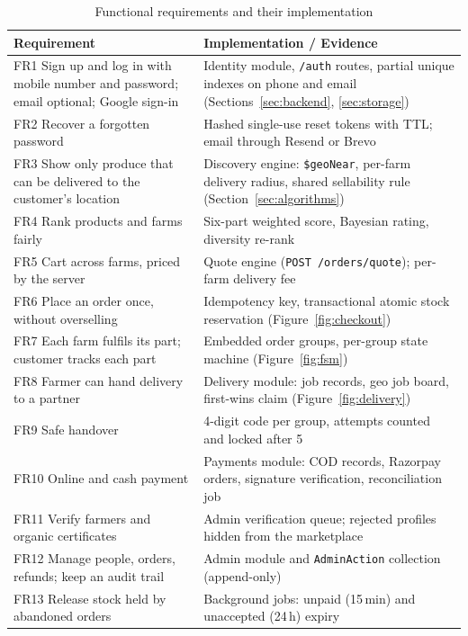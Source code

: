 \documentclass[manuscript,screen,review]{acmart}
\begin{document}
\begin{table}[htbp]
  \caption{Functional requirements and their implementation}
  \label{tab:requirements}
  \small
  \begin{tabularx}{\columnwidth}{@{}p{}L@{}}
    \toprule
    \textbf{Requirement} & \textbf{Implementation / Evidence} \\
    \midrule
    FR1 Sign up and log in with mobile number and password; email optional; Google sign-in & Identity module, \texttt{/auth} routes, partial unique indexes on phone and email (Sections~\ref{sec:backend}, \ref{sec:storage}) \\
    FR2 Recover a forgotten password & Hashed single-use reset tokens with TTL; email through Resend or Brevo \\
    FR3 Show only produce that can be delivered to the customer's location & Discovery engine: \texttt{\$geoNear}, per-farm delivery radius, shared sellability rule (Section~\ref{sec:algorithms}) \\
    FR4 Rank products and farms fairly & Six-part weighted score, Bayesian rating, diversity re-rank \\
    FR5 Cart across farms, priced by the server & Quote engine (\texttt{POST /orders/quote}); per-farm delivery fee \\
    FR6 Place an order once, without overselling & Idempotency key, transactional atomic stock reservation (Figure~\ref{fig:checkout}) \\
    FR7 Each farm fulfils its part; customer tracks each part & Embedded order groups, per-group state machine (Figure~\ref{fig:fsm}) \\
    FR8 Farmer can hand delivery to a partner & Delivery module: job records, geo job board, first-wins claim (Figure~\ref{fig:delivery}) \\
    FR9 Safe handover & 4-digit code per group, attempts counted and locked after 5 \\
    FR10 Online and cash payment & Payments module: COD records, Razorpay orders, signature verification, reconciliation job \\
    FR11 Verify farmers and organic certificates & Admin verification queue; rejected profiles hidden from the marketplace \\
    FR12 Manage people, orders, refunds; keep an audit trail & Admin module and \texttt{AdminAction} collection (append-only) \\
    FR13 Release stock held by abandoned orders & Background jobs: unpaid (15\,min) and unaccepted (24\,h) expiry \\
    \bottomrule
  \end{tabularx}
\end{table}
\end{document}
